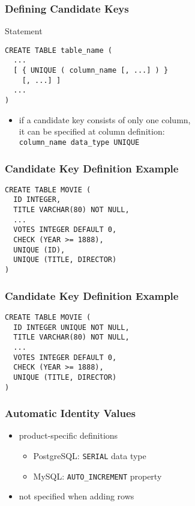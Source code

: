 \documentclass[dvipsnames]{beamer}
\theoremstyle{plain}
\begin{document}
\begin{frame}[fragile]
  \frametitle{Defining Candidate Keys}

  \begin{block}{Statement}
    \begin{lstlisting}
CREATE TABLE table_name (
  ...
  [ { UNIQUE ( column_name [, ...] ) }
    [, ...] ]
  ...
)
    \end{lstlisting}
  \end{block}

  \begin{itemize}
    \item if a candidate key consists of only one column,\\
      it can be specified at column definition:\\
      \lstinline!column_name data_type UNIQUE!
  \end{itemize}
\end{frame}

\begin{frame}[fragile]
  \frametitle{Candidate Key Definition Example}

  \begin{example}
    \begin{lstlisting}
CREATE TABLE MOVIE (
  ID INTEGER,
  TITLE VARCHAR(80) NOT NULL,
  ...
  VOTES INTEGER DEFAULT 0,
  CHECK (YEAR >= 1888),
  UNIQUE (ID),
  UNIQUE (TITLE, DIRECTOR)
)
    \end{lstlisting}
  \end{example}
\end{frame}

\begin{frame}[fragile]
  \frametitle{Candidate Key Definition Example}

  \begin{example}
    \begin{lstlisting}
CREATE TABLE MOVIE (
  ID INTEGER UNIQUE NOT NULL,
  TITLE VARCHAR(80) NOT NULL,
  ...
  VOTES INTEGER DEFAULT 0,
  CHECK (YEAR >= 1888),
  UNIQUE (TITLE, DIRECTOR)
)
   \end{lstlisting}
  \end{example}
\end{frame}

\begin{frame}[fragile]
  \frametitle{Automatic Identity Values}

  \begin{itemize}
    \item product-specific definitions

    \begin{itemize}
      \item PostgreSQL: \texttt{SERIAL} data type
      \item MySQL: \texttt{AUTO\_INCREMENT} property
    \end{itemize}

    \pause
    \item not specified when adding rows
  \end{itemize}
\end{frame}
\end{document}
